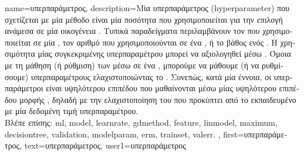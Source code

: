 {name={\foreignlanguage{greek}{υπερπαράμετρος}},
	description={\foreignlanguage{greek}{Μία υπερπαράμετρος} (hyperparameter) 
		\foreignlanguage{greek}{που σχετίζεται με μία μέθοδο}  \foreignlanguage{greek}{είναι μία ποσότητα που χρησιμοποιείται για 
		την επιλογή ανάμεσα σε μία οικογένεια} . \foreignlanguage{greek}{Τυπικά παραδείγματα περιλαμβάνουν τον}
		 \foreignlanguage{greek}{που χρησιμοποιείται σε μία} , \foreignlanguage{greek}{τον 
		αριθμό}  \foreignlanguage{greek}{που χρησιμοποιούνται σε ένα} , \foreignlanguage{greek}{ή 
		το}  \foreignlanguage{greek}{βάθος ενός} . \foreignlanguage{greek}{Η χρησιμότητα 
		μίας συγκεκριμένης υπερπαραμέτρου μπορεί να αξιολογηθεί μέσω} . \foreignlanguage{greek}{Όμοια με τη μάθηση 
		(ή ρύθμιση) των}  \foreignlanguage{greek}{μέσω}  \foreignlanguage{greek}{σε ένα} 
		, \foreignlanguage{greek}{μπορούμε να μάθουμε (ή να ρυθμίσουμε) υπερπαραμέτρους ελαχιστοποιώντας το} 
		. \foreignlanguage{greek}{Συνεπώς, κατά μία έννοια, οι υπερπαράμετροι είναι}  
		\foreignlanguage{greek}{υψηλότερου επιπέδου που μαθαίνονται μέσω μίας υψηλότερου επιπέδου μορφής} , 
		\foreignlanguage{greek}{δηλαδή με την ελαχιστοποίηση του}  \foreignlanguage{greek}{που προκύπτει από το εκπαιδευμένο} 
		 \foreignlanguage{greek}{με μία δεδομένη τιμή υπερπαραμέτρου}. 
			\\ 
		\foreignlanguage{greek}{Βλέπε επίσης:} \gls{ml}, \gls{model}, \gls{learnrate}, \gls{gdmethod}, \gls{feature}, \gls{linmodel}, 
		\gls{maximum}, \gls{decisiontree}, \gls{validation}, \gls{modelparam}, \gls{erm}, \gls{trainset}, \gls{valerr}. },
	first={\foreignlanguage{greek}{υπερπαράμετρος}},
	text={\foreignlanguage{greek}{υπερπαράμετρος}},
	user1={\foreignlanguage{greek}{υπερπαράμετρος}} %
}

